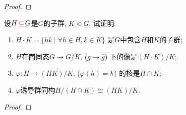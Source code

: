 \begin{proof}
    
\end{proof}

\begin{problem}
    设$H \,\textcolor{red}{\subseteq}\, G$是$G$的子群, $K \lhd G$, 试证明: 
\begin{enumerate}[(1)]
    \item $H \cdot K = \{hk \mid \forall h \in H, k \in K\}$
是$G$中包含$H$和$K$的子群;
    \item $H$在商同态$G \to G/K$, ($g \mapsto \bar{g}$)
下的像是$(H \cdot K)/K$;
    \item $\varphi:H \to (HK)/K$, ($\varphi(h) = \bar{h}$)
的核是$H \cap K$;
    \item $\varphi$诱导群同构$H/(H \cap K) \cong (HK)/K$.
\end{enumerate}
\end{problem}

\begin{proof}
    
\end{proof}